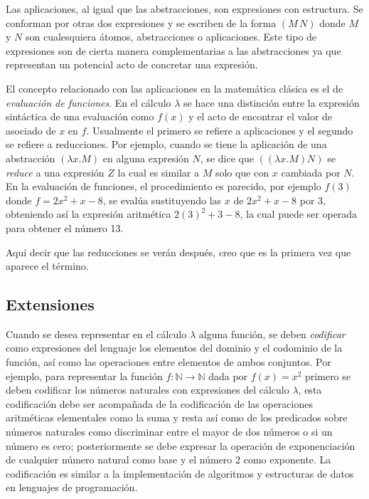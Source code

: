 Las aplicaciones, al igual que las abstracciones, son expresiones con estructura. Se conforman por otras dos expresiones y se escriben de la forma \( (M\, N) \) donde \( M \) y \( N \) son cualesquiera átomos, abstracciones o aplicaciones. Este tipo de expresiones son de cierta manera complementarias a las abstracciones ya que representan un potencial acto de concretar una expresión.

El concepto relacionado con las aplicaciones en la matemática clásica es el de \emph{evaluación de funciones}. En el cálculo \( λ \) se hace una distinción entre la expresión sintáctica de una evaluación como \( f(x) \) y el acto de encontrar el valor de asociado de \( x \) en \( f \). Usualmente el primero se refiere a aplicaciones y el segundo se refiere a reducciones. Por ejemplo, cuando se tiene la aplicación de una abstracción \( (λx.M) \) en alguna expresión \( N \), se dice que \( ((λx.M) N) \) se \emph{reduce} a una expresión \( Z \) la cual es similar a \( M \) solo que con \( x \) cambiada por \( N \). En la evaluación de funciones, el procedimiento es parecido, por ejemplo \( f(3) \) donde \( f = 2x^{2}+x-8 \), se evalúa sustituyendo las \( x \) de \( 2x^{2}+x-8 \) por 3, obteniendo así la expresión aritmética \( 2(3)^{2}+3-8 \), la cual puede ser operada para obtener el número 13.

\begin{Gutu}
Aquí decir que las reducciones se verán después, creo que es la primera vez que aparece el término.
\end{Gutu}

\subsection{Extensiones}
\label{sec:extensiones}

Cuando se desea representar en el cálculo \( λ \) alguna función, se deben \emph{codificar} como expresiones del lenguaje los elementos del dominio y el codominio de la función, así como las operaciones entre elementos de ambos conjuntos. Por ejemplo, para representar la función \( f \colon \mathbb{N} \to \mathbb{N} \) dada por \( f(x)=x^{2} \) primero se deben codificar los números naturales con expresiones del cálculo \( λ \), esta codificación debe ser acompañada de la codificación de las operaciones aritméticas elementales como la suma y resta así como de los predicados sobre números naturales como discriminar entre el mayor de dos números o si un número es cero; posteriormente se debe expresar la operación de exponenciación de cualquier número natural como base y el número \( 2 \) como exponente. La codificación es similar a la implementación de algoritmos y estructuras de datos en lenguajes de programación.

